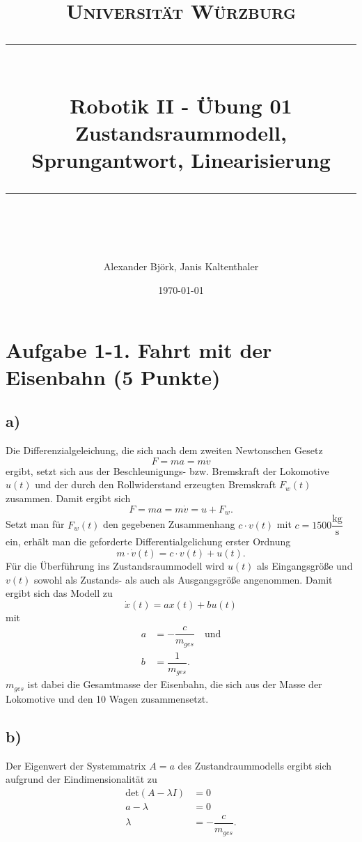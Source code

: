\documentclass[11pt]{scrartcl} %
\title{	
	\normalfont\normalsize
	\textsc{Universität Würzburg}\\ %
	\vspace{25pt} %
	\rule{\linewidth}{0.5pt}\\ %
	\vspace{20pt} %
	{\huge Robotik II - Übung 01}\\ %
	{\large Zustandsraummodell, Sprungantwort, Linearisierung}\\ %
	\vspace{12pt} %
	\rule{\linewidth}{2pt}\\ %
	\vspace{12pt} %
}
\author{\LARGE Alexander Björk, Janis Kaltenthaler} %
\date{\normalsize\today} %
\begin{document}
\maketitle %


\section*{Aufgabe 1-1. Fahrt mit der Eisenbahn (5 Punkte)}

\subsection*{a)}

Die Differenzialgeleichung, die sich nach dem zweiten Newtonschen Gesetz
\begin{equation*}
F=ma=m\dot{v}
\end{equation*}
ergibt, setzt sich aus der Beschleunigungs- bzw. Bremskraft der Lokomotive $u(t)$ und der durch den Rollwiderstand erzeugten Bremskraft $F_w(t)$ zusammen. Damit ergibt sich
\begin{equation*}
F=ma=m\dot{v}=u+F_w.
\end{equation*}
Setzt man für $F_w(t)$ den gegebenen Zusammenhang $c \cdot v(t)$ mit $c=1500 \dfrac{\text{kg}}{\text{s}}$ ein, erhält man die geforderte Differentialgelichung erster Ordnung
\begin{equation*}
m \cdot \dot{v}(t) = c \cdot v(t) + u(t).
\end{equation*}
Für die Überführung ins Zustandsraummodell wird $u(t)$ als Eingangsgröße und $v(t)$ sowohl als Zustands- als auch als Ausgangsgröße angenommen. Damit ergibt sich das Modell zu
\begin{equation*}
\dot{x}(t)=ax(t)+bu(t)
\end{equation*}
mit 
\begin{align*}
a &= -\dfrac{c}{m_{ges}} \quad \text{und} \\
b &= \dfrac{1}{m_{ges}}.
\end{align*}
$m_{ges}$ ist dabei die Gesamtmasse der Eisenbahn, die sich aus der Masse der Lokomotive und den 10 Wagen zusammensetzt.

\subsection*{b)}
Der Eigenwert der Systemmatrix $A=a$ des Zustandraummodells ergibt sich aufgrund der Eindimensionalität zu
\begin{align*}
\text{det}(A-\lambda I) &= 0 \\
a - \lambda &= 0 \\
\lambda &= -\dfrac{c}{m_{ges}}.
\end{align*}
\end{document}
